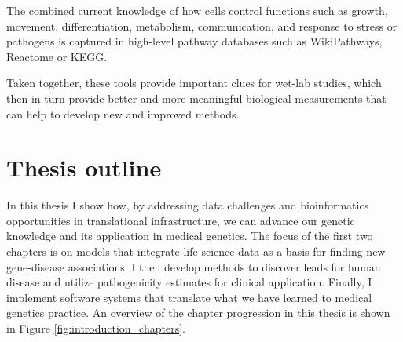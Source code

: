 The combined current knowledge of how cells control functions such as growth, movement, differentiation, metabolism, communication, and response to stress or pathogens is captured in high-level pathway databases such as WikiPathways\cite{Kutmon_2015}, Reactome\cite{Fabregat_2015} or KEGG\cite{Kanehisa_2015}.

Taken together, these tools provide important clues for wet-lab studies, which then in turn provide better and more meaningful biological measurements that can help to develop new and improved methods.


\section{Thesis outline} \label{intro_outline}

In this thesis I show how, by addressing data challenges and bioinformatics opportunities in translational infrastructure, we can advance our genetic knowledge and its application in medical genetics.
The focus of the first two chapters is on models that integrate life science data as a basis for finding new gene-disease associations.
I then develop methods to discover leads for human disease and utilize pathogenicity estimates for clinical application. 
Finally, I implement software systems that translate what we have learned to medical genetics practice.
An overview of the chapter progression in this thesis is shown in Figure \ref{fig:introduction_chapters}.

